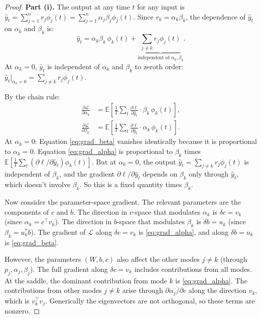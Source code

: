 \documentclass[11pt,a4paper]{article}
\theoremstyle{definition}
\newcommand{\E}{\mathbb{E}}
\newcommand{\cL}{\mathcal{L}}
\begin{document}
\begin{proof}
\textbf{Part (i).}
The output at any time $t$ for any input is
$\hat{y}_t = \sum_{j=1}^n r_j \phi_j(t)
= \sum_{j=1}^n \alpha_j \beta_j \phi_j(t)$.
Since $r_k = \alpha_k \beta_k$, the dependence of $\hat{y}_t$ on
$\alpha_k$ and $\beta_k$ is:
\begin{equation}\label{eq:output_alphabeta}
  \hat{y}_t = \alpha_k \beta_k\, \phi_k(t) +
  \underbrace{\sum_{j \neq k} r_j \phi_j(t)}_{\text{independent
  of } \alpha_k, \beta_k}.
\end{equation}
At $\alpha_k = 0$, $\hat{y}_t$ is independent of $\alpha_k$ and
$\beta_k$ to zeroth order: $\hat{y}_t|_{\alpha_k=0} =
\sum_{j\neq k} r_j\phi_j(t)$.

By the chain rule:
\begin{align}
  \frac{\partial\cL}{\partial\alpha_k}
  &= \E\!\left[\frac{1}{T}\sum_t
    \frac{\partial\ell}{\partial\hat{y}_t}\cdot
    \beta_k\,\phi_k(t)\right], \label{eq:grad_alpha} \\
  \frac{\partial\cL}{\partial\beta_k}
  &= \E\!\left[\frac{1}{T}\sum_t
    \frac{\partial\ell}{\partial\hat{y}_t}\cdot
    \alpha_k\,\phi_k(t)\right]. \label{eq:grad_beta}
\end{align}
At $\alpha_k = 0$: Equation \eqref{eq:grad_beta} vanishes
identically because it is proportional to $\alpha_k = 0$.
Equation \eqref{eq:grad_alpha} is proportional to $\beta_k$
times $\E[\frac{1}{T}\sum_t (\partial\ell/\partial\hat{y}_t)
\phi_k(t)]$. But at $\alpha_k = 0$, the output
$\hat{y}_t = \sum_{j\neq k}r_j\phi_j(t)$ is independent of
$\beta_k$, and the gradient $\partial\ell/\partial\hat{y}_t$
depends on $\beta_k$ only through $\hat{y}_t$, which doesn't
involve $\beta_k$. So this is a fixed quantity times $\beta_k$.

Now consider the parameter-space gradient. The relevant
parameters are the components of $c$ and $b$. The direction
in $c$-space that modulates $\alpha_k$ is $\delta c = v_k$
(since $\alpha_k = c^{\top}v_k$). The direction in $b$-space
that modulates $\beta_k$ is $\delta b = u_k$ (since
$\beta_k = u_k^*b$). The gradient of $\cL$ along
$\delta c = v_k$ is \eqref{eq:grad_alpha}, and along
$\delta b = u_k$ is \eqref{eq:grad_beta}.

However, the parameters $(W, b, c)$ also affect the other modes
$j \neq k$ (through $p_j, \alpha_j, \beta_j$). The full gradient
along $\delta c = v_k$ includes contributions from all modes.
At the saddle, the dominant contribution from mode $k$ is
\eqref{eq:grad_alpha}. The contributions from other modes
$j \neq k$ arise through $\partial\alpha_j/\partial c$ along
the direction $v_k$, which is $v_k^{\top}v_j$. Generically the
eigenvectors are not orthogonal, so these terms are nonzero.


\end{proof}
\end{document}

